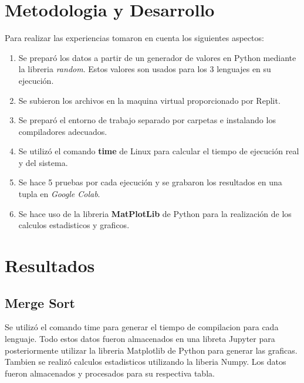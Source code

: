 \documentclass{article}
\begin{document}
    \section{Metodologia y Desarrollo}
    Para realizar las experiencias tomaron en cuenta los siguientes aspectos:
    
    \begin{enumerate}
        \item Se preparó los datos a partir de un generador de valores en Python mediante la libreria \textit{random}. Estos valores son usados para los 3 lenguajes en su ejecución.
        \item Se subieron los archivos en la maquina virtual proporcionado por Replit.
        \item Se preparó el entorno de trabajo separado por carpetas e instalando los compiladores adecuados.
        \item Se utilizó el comando \textbf{time} de Linux para calcular el tiempo de ejecución real y del sistema.
        \item Se hace 5 pruebas por cada ejecución y se grabaron los resultados en una tupla en \textit{Google Colab}.
        \item Se hace uso de la libreria \textbf{MatPlotLib} de Python para la realización de los calculos estadisticos y graficos.
    \end{enumerate}

\section{Resultados}
\subsection{Merge Sort} 
Se utilizó el comando time para generar el tiempo de compilacion para cada lenguaje. Todo estos datos fueron almacenados en una libreta Jupyter para posteriormente utilizar la libreria Matplotlib de Python para generar las graficas.
 Tambien se realizó calculos estadisticos utilizando la liberia Numpy. Los datos fueron almacenados y procesados para su respectiva tabla.
\end{document}
